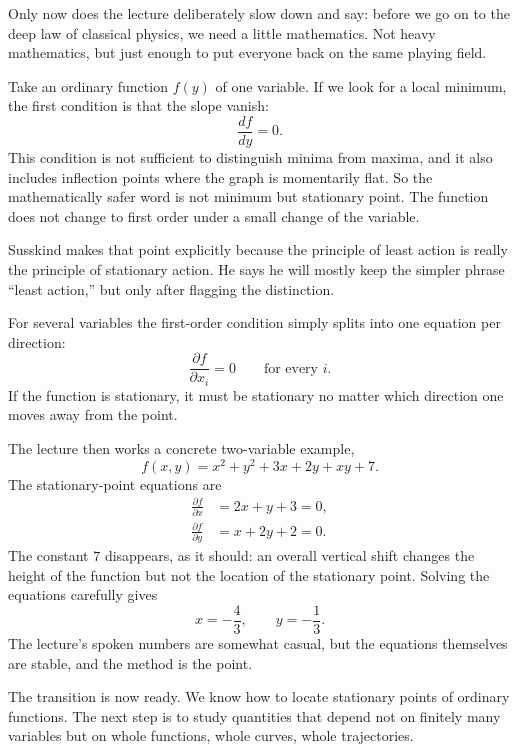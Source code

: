 Only now does the lecture deliberately slow down and say: before we go on to the deep law of classical physics, we need a little mathematics. Not heavy mathematics, but just enough to put everyone back on the same playing field.

Take an ordinary function \(f(y)\) of one variable. If we look for a local minimum, the first condition is that the slope vanish:
\begin{equation}
\frac{df}{dy}=0.
\end{equation}
This condition is not sufficient to distinguish minima from maxima, and it also includes inflection points where the graph is momentarily flat. So the mathematically safer word is not minimum but stationary point. The function does not change to first order under a small change of the variable.

Susskind makes that point explicitly because the principle of least action is really the principle of stationary action. He says he will mostly keep the simpler phrase ``least action,'' but only after flagging the distinction.

For several variables the first-order condition simply splits into one equation per direction:
\begin{equation}
\frac{\partial f}{\partial x_i}=0
\qquad \text{for every } i.
\end{equation}
If the function is stationary, it must be stationary no matter which direction one moves away from the point.

The lecture then works a concrete two-variable example,
\begin{equation}
f(x,y)=x^2+y^2+3x+2y+xy+7.
\end{equation}
The stationary-point equations are
\begin{align}
\frac{\partial f}{\partial x} &= 2x+y+3=0, \\
\frac{\partial f}{\partial y} &= x+2y+2=0.
\end{align}
The constant \(7\) disappears, as it should: an overall vertical shift changes the height of the function but not the location of the stationary point. Solving the equations carefully gives
\begin{equation}
x=-\frac43,
\qquad
y=-\frac13.
\end{equation}
The lecture's spoken numbers are somewhat casual, but the equations themselves are stable, and the method is the point.

The transition is now ready. We know how to locate stationary points of ordinary functions. The next step is to study quantities that depend not on finitely many variables but on whole functions, whole curves, whole trajectories.

